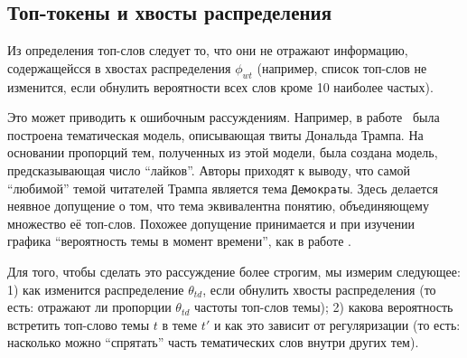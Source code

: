 \subsection{Топ-токены и хвосты распределения}


Из определения топ-слов следует то, что они не отражают информацию, содержащейсся в хвостах распределения $\phi_{wt}$ (например, список топ-слов не изменится, если обнулить вероятности всех слов кроме 10 наиболее частых).

Это может приводить к ошибочным рассуждениям. Например, в работе~\cite{wang2016catching} была построена тематическая модель, описывающая твиты Дональда Трампа. На основании пропорций тем, полученных из этой модели, была создана модель, предсказывающая число ``лайков''. Авторы приходят к выводу, что самой ``любимой'' темой читателей Трампа является тема \texttt{Демократы}. Здесь делается неявное допущение о том, что тема эквивалентна понятию, объединяющему множество её топ-слов. Похожее допущение принимается и при изучении графика ``вероятность темы в момент времени'', как в работе \cite{monsters_men, dispatch}.

Для того, чтобы сделать это рассуждение более строгим, мы измерим следующее: 1) как изменится распределение $\theta_{td}$, если обнулить хвосты распределения (то есть: отражают ли пропорции $\theta_{td}$ частоты топ-слов темы); 2) какова вероятность встретить топ-слово темы $t$ в теме $t'$ и как это зависит от регуляризации (то есть: насколько можно ``спрятать'' часть тематических слов внутри других тем).






